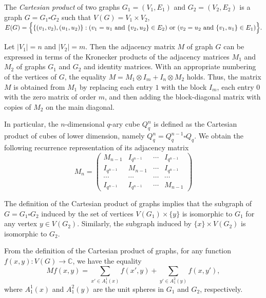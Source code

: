 \documentclass[11pt]{article}
\theoremstyle{definition}
\begin{document}
The {\sl Cartesian product} of two graphs $G_1=(V_1,E_1)$ and
$G_2=(V_2,E_2)$ is a graph $G=G_1\square G_2$ such that
$V(G)=V_1\times V_2$, 
$E(G)=\Bigl\{\{(v_1,v_2),(u_1,u_2)\} :
(v_1=u_1 \text{ and } \{v_2,u_2\}\in E_2)
\text{ or }
(v_2=u_2 \text{ and } \{v_1,u_1\}\in E_1)
\Bigr\}.$









Let $|V_1|=n$ and $|V_2|=m$. Then the adjacency matrix $M$ of graph $G$
can be expressed in terms of the Kronecker products of the adjacency matrices $M_1$
and $M_2$ of graphs $G_1$ and $G_2$ and identity matrices. With an appropriate
numbering of the vertices of  $G$, the equality $M=M_1 \otimes
I_{m} + I_{n} \otimes M_2$ holds. 
Thus, the matrix $M$ is obtained from $M_1$ by replacing each
entry $1$ with the block $I_m$, each entry $0$ with the zero
matrix of order $m$, and then adding the block-diagonal matrix
with copies of $M_2$ on the main diagonal.



In particular, the $n$-dimensional $q$-ary cube $Q^n_q$ is defined as the
Cartesian product of cubes of lower dimension, namely
$Q^n_q=Q^{n-1}_q\square Q_q$. We obtain the following
recurrence representation of its adjacency matrix
\[
M_{n}=
\begin{pmatrix}
M_{n-1} & I_{q^{n-1}}&\cdots & I_{q^{n-1}} \\
I_{q^{n-1}} & M_{n-1}&\cdots & I_{q^{n-1}} \\
\cdots & \cdots&\cdots &\cdots\\
I_{q^{n-1}} &  I_{q^{n-1}} &\cdots & M_{n-1}
\end{pmatrix}
\]



The definition of the Cartesian product of graphs implies that the subgraph
of  $G=G_1\square G_2$ induced by the set of vertices
$V(G_1)\times \{y\}$ is isomorphic to  $G_1$ for any vertex $y\in
V(G_2)$. Similarly, the subgraph induced by $\{x\}\times V(G_2)$ is isomorphic to $G_2$.

From the definition of the Cartesian product of graphs, for any function
$f(x,y): V(G) \rightarrow \mathbb C$, we have the equality $$M f(x,y) =
\sum\limits_{x' \in A_1^1(x)} f(x',y) +
\sum\limits_{y' \in
A_1^2(y)}f(x,y'),$$
where $A_1^1(x)$ and $A_1^2(y)$ are the unit spheres in  $G_1$ and
$G_2$, respectively.
\end{document}
